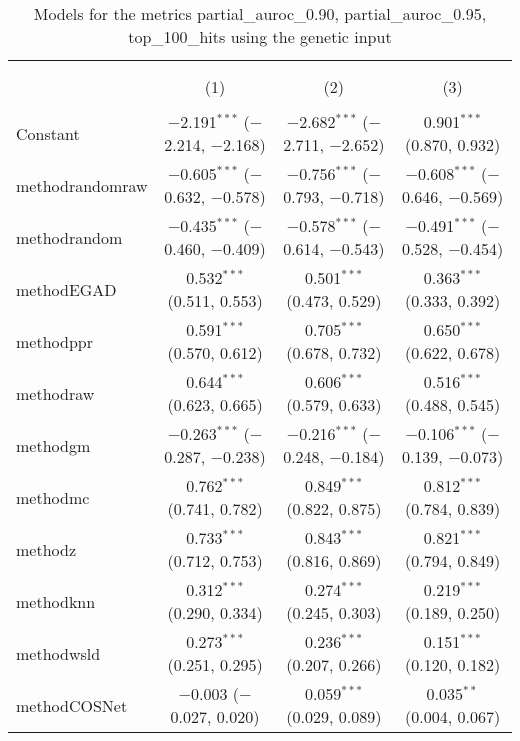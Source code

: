 
\begin{table}[!htbp] \centering 
  \caption{Models for the metrics partial_auroc_0.90, partial_auroc_0.95, top_100_hits using the genetic input} 
  \label{} 
\begin{tabular}{@{\extracolsep{5pt}}lccc} 
\\[-1.8ex]\hline 
\hline \\[-1.8ex] 
\\[-1.8ex] & (1) & (2) & (3)\\ 
\hline \\[-1.8ex] 
 Constant & $-$2.191$^{***}$ ($-$2.214, $-$2.168) & $-$2.682$^{***}$ ($-$2.711, $-$2.652) & 0.901$^{***}$ (0.870, 0.932) \\ 
  methodrandomraw & $-$0.605$^{***}$ ($-$0.632, $-$0.578) & $-$0.756$^{***}$ ($-$0.793, $-$0.718) & $-$0.608$^{***}$ ($-$0.646, $-$0.569) \\ 
  methodrandom & $-$0.435$^{***}$ ($-$0.460, $-$0.409) & $-$0.578$^{***}$ ($-$0.614, $-$0.543) & $-$0.491$^{***}$ ($-$0.528, $-$0.454) \\ 
  methodEGAD & 0.532$^{***}$ (0.511, 0.553) & 0.501$^{***}$ (0.473, 0.529) & 0.363$^{***}$ (0.333, 0.392) \\ 
  methodppr & 0.591$^{***}$ (0.570, 0.612) & 0.705$^{***}$ (0.678, 0.732) & 0.650$^{***}$ (0.622, 0.678) \\ 
  methodraw & 0.644$^{***}$ (0.623, 0.665) & 0.606$^{***}$ (0.579, 0.633) & 0.516$^{***}$ (0.488, 0.545) \\ 
  methodgm & $-$0.263$^{***}$ ($-$0.287, $-$0.238) & $-$0.216$^{***}$ ($-$0.248, $-$0.184) & $-$0.106$^{***}$ ($-$0.139, $-$0.073) \\ 
  methodmc & 0.762$^{***}$ (0.741, 0.782) & 0.849$^{***}$ (0.822, 0.875) & 0.812$^{***}$ (0.784, 0.839) \\ 
  methodz & 0.733$^{***}$ (0.712, 0.753) & 0.843$^{***}$ (0.816, 0.869) & 0.821$^{***}$ (0.794, 0.849) \\ 
  methodknn & 0.312$^{***}$ (0.290, 0.334) & 0.274$^{***}$ (0.245, 0.303) & 0.219$^{***}$ (0.189, 0.250) \\ 
  methodwsld & 0.273$^{***}$ (0.251, 0.295) & 0.236$^{***}$ (0.207, 0.266) & 0.151$^{***}$ (0.120, 0.182) \\ 
  methodCOSNet & $-$0.003 ($-$0.027, 0.020) & 0.059$^{***}$ (0.029, 0.089) & 0.035$^{**}$ (0.004, 0.067) \\ 

\end{tabular}
\end{table}
